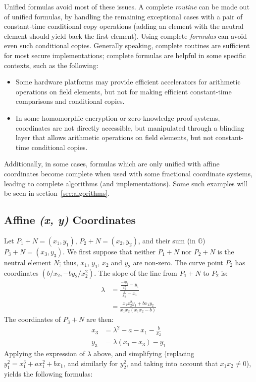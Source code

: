 \documentclass{llncs}
\newcommand{\bG}{\mathbb{G}}
\begin{document}
Unified formulas avoid most of these issues. A complete \emph{routine}
can be made out of unified formulas, by handling the remaining
exceptional cases with a pair of constant-time conditional copy
operations (adding an element with the neutral element should yield back
the first element). Using complete \emph{formulas} can avoid even such
conditional copies. Generally speaking, complete routines are
sufficient for most secure implementations; complete formulas are
helpful in some specific contexts, such as the following:
\begin{itemize}

    \item Some hardware platforms may provide efficient accelerators
    for arithmetic operations on field elements, but not for making
    efficient constant-time comparisons and conditional copies.

    \item In some homomorphic encryption or zero-knowledge proof
    systems, coordinates are not directly accessible, but manipulated
    through a blinding layer that allows arithmetic operations on field
    elements, but not constant-time conditional copies.

\end{itemize}

Additionally, in some cases, formulas which are only unified with affine
coordinates become complete when used with some fractional coordinate
systems, leading to complete algorithms (and implementations). Some such
examples will be seen in section~\ref{sec:algorithms}.

\subsection{Affine \emph{(x, y)} Coordinates}\label{sec:formulas:xy}

Let $P_1+N = (x_1,y_1)$, $P_2+N = (x_2,y_2)$, and their sum (in $\bG$)
$P_3+N = (x_3,y_3)$. We first suppose that neither $P_1+N$ nor $P_2+N$
is the neutral element $N$; thus, $x_1$, $y_1$, $x_2$ and $y_2$ are
non-zero. The curve point $P_2$ has coordinates $(b/x_2, -by_2/x_2^2)$.
The slope of the line from $P_1+N$ to $P_2$ is:
\begin{align*}
    \lambda &= \frac{\frac{-by_2}{x_2^2} - y_1}{\frac{b}{x_2} - x_1} \\
    &= \frac{x_1 x_2^2 y_1 + b x_1 y_2}{x_1 x_2 (x_1 x_2 - b)}
\end{align*}
The coordinates of $P_3+N$ are then:
\begin{align*}
    x_3 &= \lambda^2 - a - x_1 - \frac{b}{x_2} \\
    y_3 &= \lambda (x_1 - x_3) - y_1
\end{align*}
Applying the expression of $\lambda$ above, and simplifying (replacing
$y_1^2 = x_1^3 + ax_1^2 + bx_1$, and similarly for $y_2^2$, and taking
into account that $x_1 x_2 \neq 0$), yields the following formulas:
\end{document}
